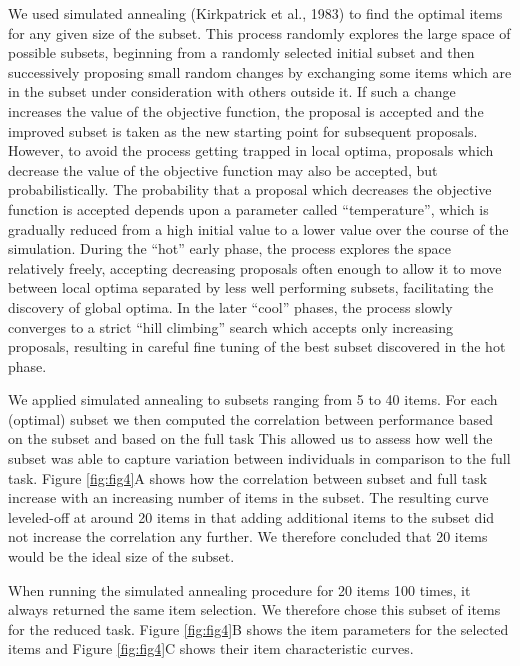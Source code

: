 \documentclass[
  man,floatsintext]{apa6}
\begin{document}
We used simulated annealing (Kirkpatrick et al., 1983) to find the optimal items for any given size of the subset. This process randomly explores the large space of possible subsets, beginning from a randomly selected initial subset and then successively proposing small random changes by exchanging some items which are in the subset under consideration with others outside it. If such a change increases the value of the objective function, the proposal is accepted and the improved subset is taken as the new starting point for subsequent proposals. However, to avoid the process getting trapped in local optima, proposals which decrease the value of the objective function may also be accepted, but probabilistically. The probability that a proposal which decreases the objective function is accepted depends upon a parameter called ``temperature'', which is gradually reduced from a high initial value to a lower value over the course of the simulation. During the ``hot'' early phase, the process explores the space relatively freely, accepting decreasing proposals often enough to allow it to move between local optima separated by less well performing subsets, facilitating the discovery of global optima. In the later ``cool'' phases, the process slowly converges to a strict ``hill climbing'' search which accepts only increasing proposals, resulting in careful fine tuning of the best subset discovered in the hot phase.

We applied simulated annealing to subsets ranging from 5 to 40 items. For each (optimal) subset we then computed the correlation between performance based on the subset and based on the full task This allowed us to assess how well the subset was able to capture variation between individuals in comparison to the full task. Figure \ref{fig:fig4}A shows how the correlation between subset and full task increase with an increasing number of items in the subset. The resulting curve leveled-off at around 20 items in that adding additional items to the subset did not increase the correlation any further. We therefore concluded that 20 items would be the ideal size of the subset.

When running the simulated annealing procedure for 20 items 100 times, it always returned the same item selection. We therefore chose this subset of items for the reduced task. Figure \ref{fig:fig4}B shows the item parameters for the selected items and Figure \ref{fig:fig4}C shows their item characteristic curves.
\end{document}
